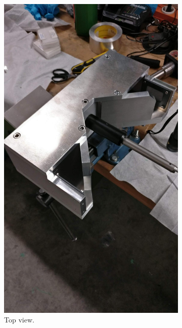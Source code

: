\begin{figure} [H]
	\centering
	\begin{subfigure}[t]{0.45\textwidth}
		\includegraphics[width=\textwidth]{InventorPics/Real_pic_DUCC_complete.jpeg}
		\caption{Top view.}
	\end{subfigure}%
	\hfill
	\begin{subfigure}[t]{0.45\textwidth}
		\centering

\end{subfigure}
\end{figure}
